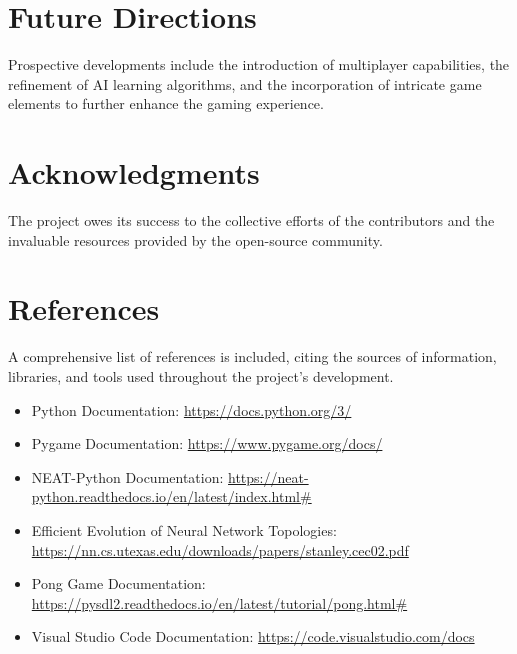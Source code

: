\documentclass[10pt]{article}
\begin{document}
\section{Future Directions}
Prospective developments include the introduction of multiplayer capabilities, the refinement of AI learning algorithms, and the incorporation of intricate game elements to further enhance the gaming experience.

\section{Acknowledgments}
The project owes its success to the collective efforts of the contributors and the invaluable resources provided by the open-source community.

\section{References} A comprehensive list of references is included, citing the sources of information, libraries, and tools used throughout the project’s development.
\begin{itemize} 
    \item Python Documentation: \url{https://docs.python.org/3/}
    \item Pygame Documentation: \url{https://www.pygame.org/docs/} 
    \item NEAT-Python Documentation: \url{https://neat-python.readthedocs.io/en/latest/index.html#} 
    \item Efficient Evolution of Neural Network Topologies: \url{https://nn.cs.utexas.edu/downloads/papers/stanley.cec02.pdf}
    \item Pong Game Documentation: \url{https://pysdl2.readthedocs.io/en/latest/tutorial/pong.html#}  
    \item Visual Studio Code Documentation: \url{https://code.visualstudio.com/docs} 
\end{itemize}

\newpage
\end{document}
